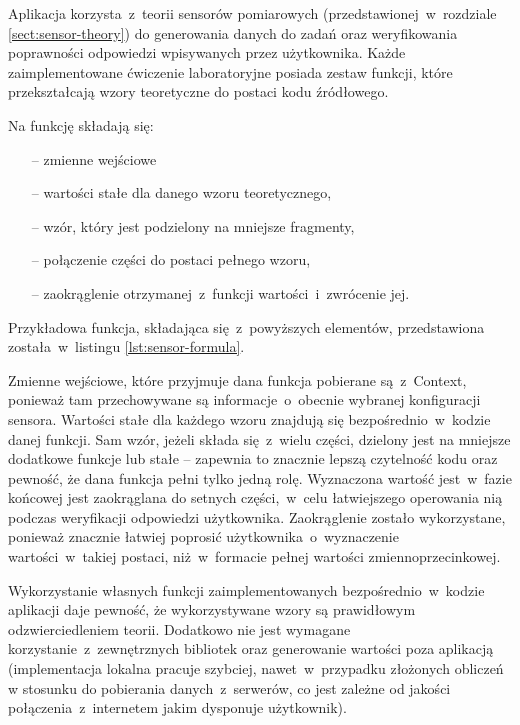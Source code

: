 Aplikacja korzysta~z~teorii sensorów pomiarowych (przedstawionej~w~rozdziale
\ref{sect:sensor-theory}) do generowania danych do zadań oraz weryfikowania poprawności odpowiedzi
wpisywanych przez użytkownika. Każde zaimplementowane ćwiczenie laboratoryjne posiada zestaw
funkcji, które przekształcają wzory teoretyczne do postaci kodu źródłowego.

Na funkcję składają się:
\begin{itemize}
  \item[--] zmienne wejściowe
  \item[--] wartości stałe dla danego wzoru teoretycznego,
  \item[--] wzór, który jest podzielony na mniejsze fragmenty,
  \item[--] połączenie części do postaci pełnego wzoru,
  \item[--] zaokrąglenie otrzymanej~z~funkcji wartości~i~zwrócenie jej.
\end{itemize}
Przykładowa funkcja, składająca się~z~powyższych elementów, przedstawiona została~w~listingu
\ref{lst:sensor-formula}.


Zmienne wejściowe, które przyjmuje dana funkcja pobierane są~z~Context, ponieważ tam przechowywane
są informacje~o~obecnie wybranej konfiguracji sensora. Wartości stałe dla każdego wzoru znajdują się
bezpośrednio~w~kodzie danej funkcji. Sam wzór, jeżeli składa się~z~wielu części, dzielony jest na
mniejsze dodatkowe funkcje lub stałe -- zapewnia to znacznie lepszą czytelność kodu oraz pewność, że
dana funkcja pełni tylko jedną rolę. Wyznaczona wartość jest~w~fazie końcowej jest zaokrąglana do
setnych części,~w~celu łatwiejszego operowania nią podczas weryfikacji odpowiedzi użytkownika.
Zaokrąglenie zostało wykorzystane, ponieważ znacznie łatwiej poprosić użytkownika~o~wyznaczenie
wartości~w~takiej postaci, niż~w~formacie pełnej wartości zmiennoprzecinkowej.

Wykorzystanie własnych funkcji zaimplementowanych bezpośrednio~w~kodzie aplikacji daje pewność, że
wykorzystywane wzory są prawidłowym odzwierciedleniem teorii. Dodatkowo nie jest wymagane
korzystanie~z~zewnętrznych bibliotek oraz generowanie wartości poza aplikacją (implementacja lokalna
pracuje szybciej, nawet~w~przypadku złożonych obliczeń w stosunku do pobierania danych~z~serwerów,
co jest zależne od jakości połączenia~z~internetem jakim dysponuje użytkownik).